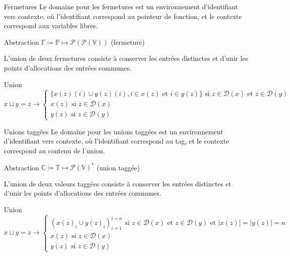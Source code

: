 \documentclass{beamer}
\begin{document}
\begin{frame}{Fermetures}
    Le domaine pour les fermetures est un environnement d'identifiant vers contexte, où l'identifiant correspond au pointeur de fonction, et le contexte correspond aux variables libres.
    \begin{block}{Abstraction}
        $\mathbb{F} \coloneqq \mathbb{P} \mapsto \mathcal{P}(\mathcal{P}(\mathbb{V}))$ (fermeture)
    \end{block}

    L'union de deux fermetures consiste à conserver les entrées distinctes et d'unir les points d'allocations des entrées communes.%
    
    \begin{block}{Union}
        $$
        x \sqcup y = z \rightarrow
        \begin{cases}
            \lbrace x(z)(i) \cup y(z)(i), i \in x(z) \text{ et } i \in y(z) \rbrace \text{ si } z \in \mathcal{D}(x) \text{ et } z \in \mathcal{D}(y) \\
            x(z) \text{ si } z \in \mathcal{D}(x) \\
            y(z) \text{ si } z \in \mathcal{D}(y)
        \end{cases}
        $$
    \end{block}
\end{frame}

\begin{frame}{Unions taggées}
    Le domaine pour les unions taggées est un environnement d'identifiant vers contexte, où l'identifiant correspond au tag, et le contexte correspond au contenu de l'union.

    \begin{block}{Abstraction}
        $\mathbb{C} \coloneqq \mathbb{T} \mapsto \mathcal{P}(\mathbb{V})^{*}$ (union taggée)
    \end{block}

    L'union de deux valeurs taggées consiste à conserver les entrées distinctes et d'unir les points d'allocations des entrées communes.%
    
    \begin{block}{Union}
        $$
        x \sqcup y = z \rightarrow
        \begin{cases}
            \left( x(z)_i \cup y(z)_i \right)_{i=1}^{i=n} \text{ si } z \in \mathcal{D}(x) \text{ et } z \in \mathcal{D}(y) \text{ et } |x(z)| = |y(z)| = n \\
            x(z) \text{ si } z \in \mathcal{D}(x) \\
            y(z) \text{ si } z \in \mathcal{D}(y)
        \end{cases}
        $$
    \end{block}
\end{frame}
\end{document}
